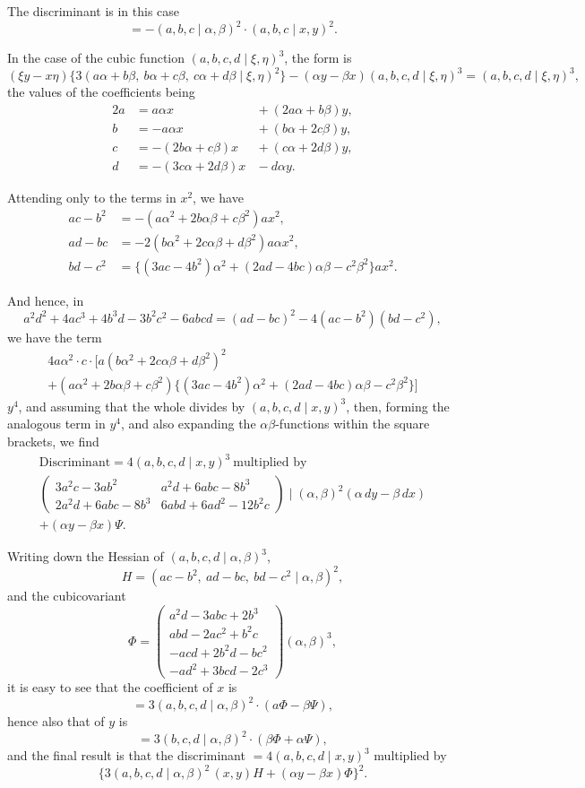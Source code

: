 \documentclass[12pt,a4paper]{article}
\theoremstyle{plain}
\begin{document}
The discriminant is in this case
\[
= -(a,b,c\mid\alpha,\beta)^2\cdot(a,b,c\mid x,y)^2.
\]

In the case of the cubic function $(a,b,c,d\mid\xi,\eta)^3$, the form is
\[
(\xi y-x\eta)\{3(a\alpha+b\beta,\ b\alpha+c\beta,\ c\alpha+d\beta\mid\xi,\eta)^2\}
-(\alpha y-\beta x)(a,b,c,d\mid\xi,\eta)^3
= (a,b,c,d\mid\xi,\eta)^3,
\]
the values of the coefficients being
\begin{alignat*}{2}
a &= a\alpha x &{}+ (2a\alpha+b\beta)y,\\
b &= -a\alpha x &{}+ (b\alpha+2c\beta)y,\\
c &= -(2b\alpha+c\beta)x &{}+ (c\alpha+2d\beta)y,\\
d &= -(3c\alpha+2d\beta)x &{}- d\alpha y.
\end{alignat*}

Attending only to the terms in $x^2$, we have
\begin{align*}
ac-b^2 &= -(a\alpha^2+2b\alpha\beta+c\beta^2)ax^2,\\
ad-bc &= -2(b\alpha^2+2c\alpha\beta+d\beta^2)a\alpha x^2,\\
bd-c^2 &= \{(3ac-4b^2)\alpha^2+(2ad-4bc)\alpha\beta-c^2\beta^2\}ax^2.
\end{align*}

And hence, in
\[
a^2d^2+4ac^3+4b^3d-3b^2c^2-6abcd
= (ad-bc)^2-4(ac-b^2)(bd-c^2),
\]
we have the term
\begin{multline*}
4a\alpha^2\cdot c\cdot[a(b\alpha^2+2c\alpha\beta+d\beta^2)^2\\
+(a\alpha^2+2b\alpha\beta+c\beta^2)
\{(3ac-4b^2)\alpha^2+(2ad-4bc)\alpha\beta-c^2\beta^2\}]
\end{multline*}
$y^4$, and assuming that the whole divides by $(a,b,c,d\mid x,y)^3$, then,
forming the analogous term in $y^4$, and also expanding the $\alpha\beta$-functions
within the square brackets, we find
\begin{multline*}
\text{Discriminant} = 4(a,b,c,d\mid x,y)^3\ \text{multiplied by}\\
\begin{pmatrix}
3a^2c-3ab^2 & a^2d+6abc-8b^3 \\
2a^2d+6abc-8b^3 & 6abd+6ad^2-12b^2c
\end{pmatrix}
\mid(\alpha,\beta)^2(\alpha\,dy-\beta\,dx)\\
+ (\alpha y-\beta x)\Psi.
\end{multline*}

Writing down the Hessian of $(a,b,c,d\mid\alpha,\beta)^3$,
\[
H = (ac-b^2,\ ad-bc,\ bd-c^2\mid\alpha,\beta)^2,
\]
and the cubicovariant
\[
\Phi =
\begin{pmatrix}
a^2d-3abc+2b^3\\
abd-2ac^2+b^2c\\
-acd+2b^2d-bc^2\\
-ad^2+3bcd-2c^3
\end{pmatrix}
(\alpha,\beta)^3,
\]
it is easy to see that the coefficient of $x$ is
\[
= 3(a,b,c,d\mid\alpha,\beta)^2\cdot(a\Phi-\beta\Psi),
\]
hence also that of $y$ is
\[
= 3(b,c,d\mid\alpha,\beta)^2\cdot(\beta\Phi+\alpha\Psi),
\]
and the final result is that the discriminant $=4(a,b,c,d\mid x,y)^3$
multiplied by
\[
\{3(a,b,c,d\mid\alpha,\beta)^2\,(x,y)H+(\alpha y-\beta x)\Phi\}^2.
\]
\end{document}
